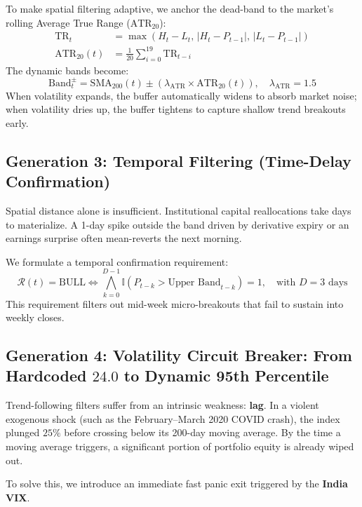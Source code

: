 \documentclass[11pt,a4paper]{article}
\begin{document}
To make spatial filtering adaptive, we anchor the dead-band to the market's rolling Average True Range ($\text{ATR}_{20}$):
\begin{align}
\text{TR}_t &= \max\left( H_t - L_t, \, |H_t - P_{t-1}|, \, |L_t - P_{t-1}| \right) \\
\text{ATR}_{20}(t) &= \frac{1}{20} \sum_{i=0}^{19} \text{TR}_{t-i}
\end{align}
The dynamic bands become:
\begin{equation}
\text{Band}_t^{\pm} = \text{SMA}_{200}(t) \pm \left( \lambda_{\text{ATR}} \times \text{ATR}_{20}(t) \right), \quad \lambda_{\text{ATR}} = 1.5
\end{equation}
When volatility expands, the buffer automatically widens to absorb market noise; when volatility dries up, the buffer tightens to capture shallow trend breakouts early.

\subsection{Generation 3: Temporal Filtering (Time-Delay Confirmation)}
Spatial distance alone is insufficient. Institutional capital reallocations take days to materialize. A 1-day spike outside the band driven by derivative expiry or an earnings surprise often mean-reverts the next morning.

We formulate a temporal confirmation requirement:
\begin{equation}
\mathcal{R}(t) = \text{BULL} \iff \bigwedge_{k=0}^{D-1} \mathbb{I}\left( P_{t-k} > \text{Upper Band}_{t-k} \right) = 1, \quad \text{with } D = 3 \text{ days}
\end{equation}
This requirement filters out mid-week micro-breakouts that fail to sustain into weekly closes.

\subsection{Generation 4: Volatility Circuit Breaker: From Hardcoded $24.0$ to Dynamic 95th Percentile}
Trend-following filters suffer from an intrinsic weakness: \textbf{lag}. In a violent exogenous shock (such as the February--March 2020 COVID crash), the index plunged $25\%$ before crossing below its 200-day moving average. By the time a moving average triggers, a significant portion of portfolio equity is already wiped out.

To solve this, we introduce an immediate fast panic exit triggered by the \textbf{India VIX}.
\end{document}
